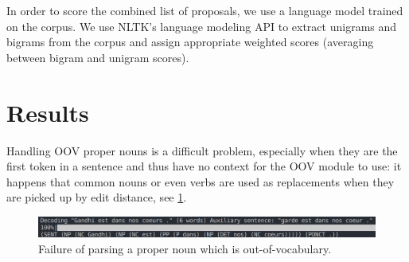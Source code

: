 \documentclass[11pt]{article}
\begin{document}
In order to score the combined list of proposals, we use a language model trained on the corpus. We use NLTK's language modeling API to extract unigrams and bigrams from the corpus and assign appropriate weighted scores (averaging between bigram and unigram scores).

\section{Results}

Handling OOV proper nouns is a difficult problem, especially when they are the first token in a sentence and thus have no context for the OOV module to use: it happens that common nouns or even verbs are used as replacements when they are picked up by edit distance, see \cref{fig:npParseFailure_didiersoulage}.

\begin{figure}[h]
	\centering
	\includegraphics[width=\linewidth]{gandhi-garde.png}
	\caption{Failure of parsing a proper noun which is out-of-vocabulary.}
	\label{fig:npParseFailure_didiersoulage}
\end{figure}


\printbibliography{}
\end{document}
